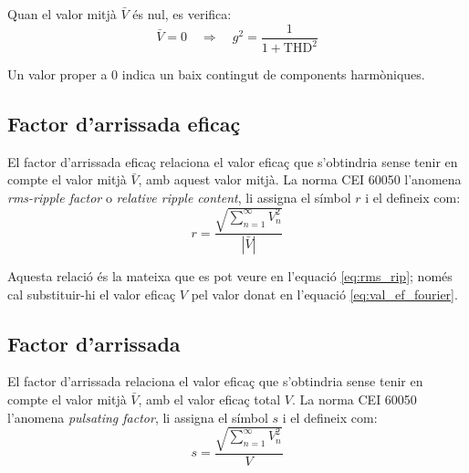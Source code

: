 Quan el valor mitjà $\bar{V}$ és nul, es verifica:
\begin{equation}
   \bar{V}=0 \quad \Rightarrow\quad g^2 = \frac{1}{1+\text{THD}^2}
\end{equation}

Un valor proper a 0 indica un baix contingut de components harmòniques.

\subsection{Factor d'arrissada eficaç}\label{sec:four_fac_arr_ef}

El factor d'arrissada eficaç relaciona el valor eficaç  que
s'obtindria sense tenir en compte el valor mitjà  $\bar{V}$, amb aquest
valor mitjà. La norma CEI 60050 l'anomena \textit{rms-ripple factor} o \textit{relative ripple content}, li assigna el símbol $r$ i el defineix com:
\begin{equation}
    r = \frac{\sqrt{\displaystyle\sum_{n=1}^\infty V^2_n}}{|\bar{V}|}
\end{equation}

Aquesta relació és la mateixa que es pot veure en l'equació  \eqref{eq:rms_rip}; només cal substituir-hi el valor eficaç $V$ pel valor donat en l'equació \eqref{eq:val_ef_fourier}.

\subsection{Factor d'arrissada}

El factor d'arrissada relaciona el valor eficaç  que
s'obtindria sense tenir en compte el valor mitjà  $\bar{V}$, amb el
valor eficaç total $V$. La norma CEI 60050 l'anomena \textit{pulsating factor}, li assigna el símbol $s$ i el defineix com:
\begin{equation}
    s = \frac{\sqrt{\displaystyle\sum_{n=1}^\infty V^2_n}}{V}
\end{equation}


